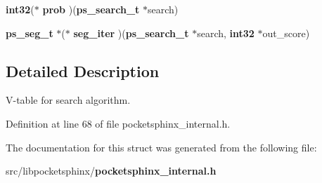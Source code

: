 \begin{DoxyCompactItemize}
\item 
{\bf int32}($\ast$ {\bfseries prob} )({\bf ps\-\_\-search\-\_\-t} $\ast$search)\label{structps__searchfuncs__s_abf94b8e4523c3f3c39fde4454f78fe16}

\item 
{\bf ps\-\_\-seg\-\_\-t} $\ast$($\ast$ {\bfseries seg\-\_\-iter} )({\bf ps\-\_\-search\-\_\-t} $\ast$search, {\bf int32} $\ast$out\-\_\-score)\label{structps__searchfuncs__s_a6b27a306eac9b96f05413aa8d6b9da61}

\end{DoxyCompactItemize}


\subsection{\-Detailed \-Description}
\-V-\/table for search algorithm. 

\-Definition at line 68 of file pocketsphinx\-\_\-internal.\-h.



\-The documentation for this struct was generated from the following file\-:\begin{DoxyCompactItemize}
\item 
src/libpocketsphinx/{\bf pocketsphinx\-\_\-internal.\-h}\end{DoxyCompactItemize}
